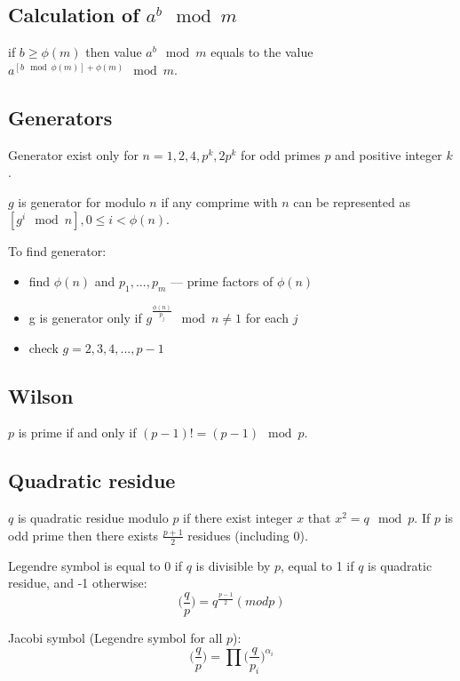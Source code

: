 \subsection{Calculation of $a^b \mod m$}
if $b \ge \phi(m)$ then value $a^b \mod m$ equals to the value $a^{\left[b \mod \phi(m)\right] + \phi(m)} \mod m$.


\subsection{Generators}
Generator exist only for $n = 1, 2, 4, p^k, 2p^k$ for odd primes $p$ and positive integer $k$. 

$g$ is generator for modulo $n$ if any comprime with $n$ can be represented as $\left[ g^i \mod n \right], 0 \le i < \phi(n)$.

To find generator:
\begin{itemize}
\item find $\phi(n)$ and $p_1, ..., p_m$ --- prime factors of $\phi(n)$
\item g is generator only if $g^{\frac{\phi(n)}{p_j}} \mod n \ne 1$ for each $j$
\item check $g = 2, 3, 4, ..., p - 1$
\end{itemize}


\subsection{Wilson}
$p$ is prime if and only if $(p - 1)! = (p - 1) \mod p$.

\subsection{Quadratic residue}
$q$ is quadratic residue modulo $p$ if there exist integer $x$ that $x^2 = q \mod p$.
If $p$ is odd prime then there exists $\frac{p + 1}{2}$ residues (including 0).


Legendre symbol is equal to 0 if $q$ is divisible by $p$, equal to 1 if $q$ is quadratic residue, and -1 otherwise:
$$\Big(\frac{q}{p}\Big) = q^{\frac{p - 1}{2}} (mod p)$$


Jacobi symbol (Legendre symbol for all $p$):
$$\Big(\frac{q}{p}\Big) = \prod{\Big(\frac{q}{p_i}\Big)^{\alpha_i}}$$

